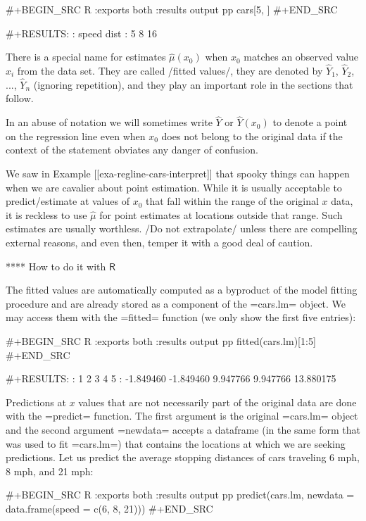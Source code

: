 #+BEGIN_SRC R :exports both :results output pp
cars[5, ]
#+END_SRC

#+RESULTS:
:   speed dist
: 5     8   16

There is a special name for estimates \( \hat{\mu}(x_{0}) \) when \(
x_{0} \) matches an observed value \(x_{i}\) from the data set. They
are called /fitted values/, they are denoted by \(\hat{Y}_{1}\),
\(\hat{Y}_{2}\), ..., \(\hat{Y}_{n}\) (ignoring repetition), and they
play an important role in the sections that follow.

In an abuse of notation we will sometimes write \(\hat{Y}\) or
\(\hat{Y}(x_{0})\) to denote a point on the regression line even when
\(x_{0}\) does not belong to the original data if the context of the
statement obviates any danger of confusion.

We saw in Example [[exa-regline-cars-interpret]] that spooky things can
happen when we are cavalier about point estimation. While it is
usually acceptable to predict/estimate at values of \(x_{0}\) that
fall within the range of the original \(x\) data, it is reckless to
use \(\hat{\mu}\) for point estimates at locations outside that
range. Such estimates are usually worthless. /Do not extrapolate/
unless there are compelling external reasons, and even then, temper it
with a good deal of caution.

**** How to do it with \(\mathsf{R}\)

The fitted values are automatically computed as a byproduct of the
model fitting procedure and are already stored as a component of the
=cars.lm= object. We may access them with the =fitted= function (we
only show the first five entries):

#+BEGIN_SRC R :exports both :results output pp 
fitted(cars.lm)[1:5]
#+END_SRC

#+RESULTS:
:         1         2         3         4         5 
: -1.849460 -1.849460  9.947766  9.947766 13.880175

Predictions at \(x\) values that are not necessarily part of the
original data are done with the =predict= function. The first argument
is the original =cars.lm= object and the second argument =newdata=
accepts a dataframe (in the same form that was used to fit =cars.lm=)
that contains the locations at which we are seeking predictions. Let
us predict the average stopping distances of cars traveling 6 mph, 8
mph, and 21 mph:

#+BEGIN_SRC R :exports both :results output pp 
predict(cars.lm, newdata = data.frame(speed = c(6, 8, 21)))
#+END_SRC

